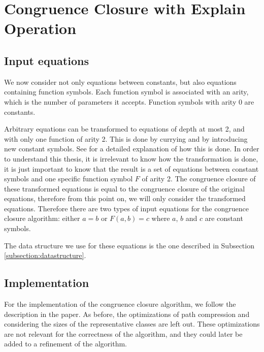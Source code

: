 
\chapter{Congruence Closure with Explain Operation}\label{chapter:congruence_closure}

\section{Input equations}

We now consider not only equations between constants, but also equations containing function symbols. Each function symbol is associated with an arity, which is the number of parameters it accepts. Function symbols with arity 0 are constants.

Arbitrary equations can be transformed to equations of depth at most 2, and with only one function of arity 2. This is done by currying and by introducing new constant symbols. See \cite{Nieuwenhuis2} for a detailed explanation of how this is done. In order to understand this thesis, it is irrelevant to know how the transformation is done, it is just important to know that the result is a set of equations between constant symbols and one specific function symbol $F$ of arity 2. The congruence closure of these transformed equations is equal to the congruence closure of the original equations, therefore from this point on, we will only consider the transformed equations. Therefore there are two types of input equations for the congruence closure algorithm: either $a = b$ or $F(a,b) = c$ where $a$, $b$ and $c$ are constant symbols.

The data structure we use for these equations is the one described in Subsection \ref{subsection:datastructure}.

\section{Implementation}

For the implementation of the congruence closure algorithm, we follow the description in the paper. \cite{Nieuwenhuis} As before, the optimizations of path compression and considering the sizes of the representative classes are left out. These optimizations are not relevant for the correctness of the algorithm, and they could later be added to a refinement of the algorithm.

